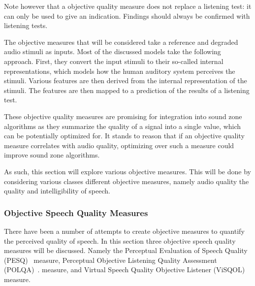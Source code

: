 Note however that a objective quality measure does not replace a listening test: it can only be used to give an 
indication.
Findings should always be confirmed with listening tests.

The objective measures that will be considered take a reference and degraded audio stimuli as inputs.
Most of the discussed models take the following approach.
First, they convert the input stimuli to their so-called internal representations, which models how the 
human auditory system perceives the stimuli.
Various features are then derived from the internal representation of the stimuli.
The features are then mapped to a prediction of the results of a listening test.

These objective quality measures are promising for integration into sound zone algorithms as they summarize the 
quality of a signal into a single value, which can be potentially optimized for. 
It stands to reason that if an objective quality measure correlates with audio quality, optimizing over such a measure
could improve sound zone algorithms.

As such, this section will explore various objective measures.
This will be done by considering various classes different objective measures, namely audio quality the quality and intelligibility of speech. 

\subsubsection{Objective Speech Quality Measures}
There have been a number of attempts to create objective measures to quantify the perceived quality of speech.
In this section three objective speech quality measures will be discussed.
Namely the Perceptual Evaluation of Speech Quality (PESQ)~\cite{rix2001perceptual} measure,
Perceptual Objective Listening Quality Assessment (POLQA)~\cite{beerends2013perceptual}. measure, and 
Virtual Speech Quality Objective Listener (ViSQOL)~\cite{hines2012visqol,chinen2020visqol} measure.

